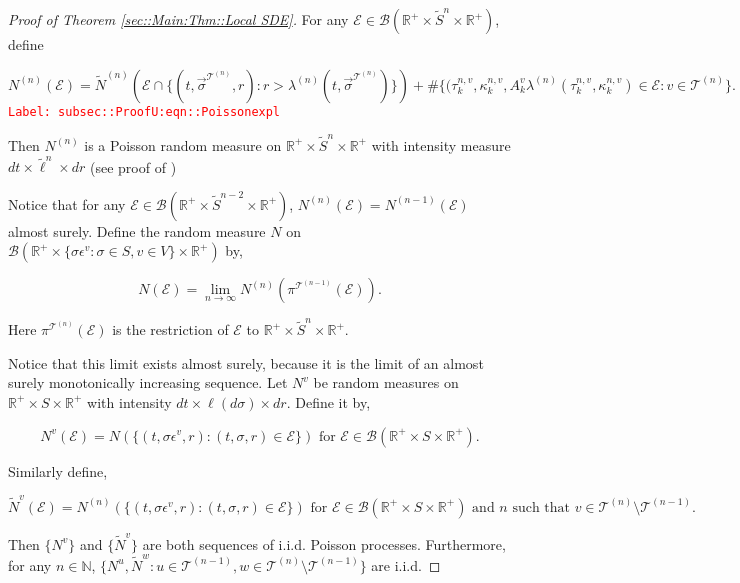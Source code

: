 \documentclass[12pt]{article}
\newcommand{\mb}{\mathbb}
\newcommand{\mc}{\mathcal}
\newcommand{\ms}{\mathscr}
\newcommand{\ra}{\rightarrow}
\newcommand{\te}{\text}
\newcommand{\ep}{\epsilon}
\newcommand{\tr}{\textcolor{red}}
\newcommand{\labe}[1]{\tr{\texttt{Label: #1}}}
\newcommand{\ind}{\hspace{24pt}}
\renewcommand{\v}{v}							%
\newcommand{\vv}{u}								%
\newcommand{\vvv}{w}							%
\renewcommand{\S}{S}							%
\newcommand{\s}{\sigma}							%
\newcommand{\sv}{\vec{\s}}						%
\newcommand{\ev}{\ep}							%
\renewcommand{\t}{t}							%
\newcommand{\proj}{\pi}							%
\newcommand{\vind}[1]{^{#1}}					%
\newcommand{\vsi}[1]{^{#1}}						%
\newcommand{\slnvind}[2]{^{#1,#2}}				%
\newcommand{\tree}{\mc{T}}						%
\newcommand{\sln}[1]{^{(#1)}}					%
\newcommand{\poiss}{N}							%
\newcommand{\Sm}{\ell}							%
\newcommand{\rate}{\lambda}						%
\renewcommand{\r}{r}							%
\newcommand{\alt}[1]{\widetilde{#1}}			%
\newcommand{\indx}[1]{_{#1}}					%
\newcommand{\rt}{\tau}							%
\renewcommand{\it}{k}							%
\newcommand{\evnt}{\mc{E}}						%
\newcommand{\rv}{A}								%
\renewcommand{\mark}{\kappa}					%
\begin{document}
\begin{proof}[Proof of Theorem \ref{sec::Main:Thm::Local SDE}]
For any \(\evnt \in \ms{B}(\mb{R}^+\times\alt{\S}^n\times\mb{R}^+)\), define

\begin{equation}
\poiss\sln{n}(\evnt) = \alt{\poiss}\sln{n}\left(\evnt\cap\{(\t,\sv\vsi{\tree\sln{n}},\r):\r > \rate\sln{n}(\t,\sv\vsi{\tree\sln{n}})\}\right) + \#\{(\rt\slnvind{n}{\v}\indx{\it},\mark\indx{\it}\slnvind{n}{\v},\rv\vind{\v}\indx{\it}\rate\sln{n}(\rt\slnvind{n}{\v}\indx{\it},\mark\indx{\it}\slnvind{n}{\v}) \in \evnt: \v\in \tree\sln{n}\}.
\label{subsec::ProofU:eqn::Poissonexpl}
\end{equation}
\labe{subsec::ProofU:eqn::Poissonexpl}

Then \(\poiss\sln{n}\) is a Poisson random measure on \(\mb{R}^+\times\alt{\S}^n\times \mb{R}^+\) with intensity measure \(d\t\times \alt{\Sm}^n\times d\r\) (see proof of \cite[Theorem 14.7.1(b)]{DalVer08})

\ind Notice that for any \(\evnt \in \ms{B}(\mb{R}^+\times \alt{\S}^{n-2}\times \mb{R}^+)\), \(\poiss\sln{n}(\evnt) = \poiss\sln{n-1}(\evnt)\) almost surely. Define the random measure \(\poiss\) on \(\ms{B}(\mb{R}^+\times \{\s\ev\vind{\v}:\s\in \S,\v \in V\}\times \mb{R}^+)\) by,

\[\poiss(\evnt) = \lim_{n \ra\infty}\poiss\sln{n}\left(\proj\vsi{\tree\sln{n-1}}(\evnt)\right).\]

Here \(\proj\vsi{\tree\sln{n}}(\evnt)\) is the restriction of \(\evnt\) to \(\mb{R}^+\times \alt{\S}^n\times\mb{R}^+\). 

\ind Notice that this limit exists almost surely, because it is the limit of an almost surely monotonically increasing sequence. Let \(\poiss\vind{\v}\) be random measures on \(\mb{R}^+\times\S\times\mb{R}^+\) with intensity \(d\t\times\Sm(d\s)\times d\r\). Define it by,

\[\poiss\vind{\v}(\evnt) = \poiss\left(\{(\t,\s\ev\vind{\v},\r):(\t,\s,\r)\in \evnt\}\right) \te{ for } \evnt \in \ms{B}(\mb{R}^+\times\S\times\mb{R}^+).\]

Similarly define,

\[\alt{\poiss}\vind{\v}(\evnt) = \poiss\sln{n}\left(\{(\t,\s\ev\vind{\v},\r):(\t,\s,\r)\in \evnt\}\right)\te{ for } \evnt \in \ms{B}(\mb{R}^+\times\S\times\mb{R}^+)\te{ and }n\te{ such that } \v\in \tree\sln{n}\setminus\tree\sln{n-1}.\]

Then \(\{\poiss\vind{\v}\}\) and \(\{\alt{\poiss}\vind{\v}\}\) are both sequences of i.i.d. Poisson processes. Furthermore, for any \(n \in \mb{N}\), \(\{\poiss\vind{\vv},\alt{\poiss}\vind{\vvv}:\vv\in \tree\sln{n-1},\vvv\in\tree\sln{n}\setminus\tree\sln{n-1}\}\) are i.i.d.


\end{proof}
\end{document}
